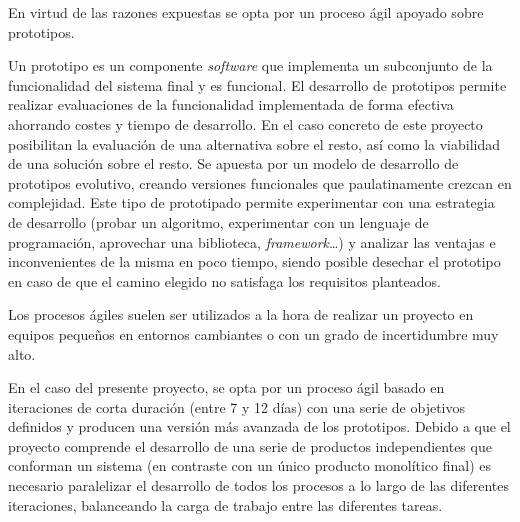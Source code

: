 En virtud de las razones expuestas se opta por un proceso ágil apoyado sobre prototipos. 

Un prototipo es un componente \textit{software} que implementa un subconjunto de la funcionalidad del sistema final y es funcional. El desarrollo de prototipos permite realizar evaluaciones de la funcionalidad implementada de forma efectiva ahorrando costes y tiempo de desarrollo. En el caso concreto de este proyecto posibilitan la evaluación de una alternativa sobre el resto, así como la viabilidad de una solución sobre el resto. Se apuesta por un modelo de desarrollo de prototipos evolutivo\cite{10.1109/TSE.1975.6312870}, creando versiones funcionales que paulatinamente crezcan en complejidad. Este tipo de prototipado permite experimentar con una estrategia de desarrollo (probar un algoritmo, experimentar con un lenguaje de programación, aprovechar una biblioteca, \textit{framework}\dots) y analizar las ventajas e inconvenientes de la misma en poco tiempo, siendo posible desechar el prototipo en caso de que el camino elegido no satisfaga los requisitos planteados.

Los procesos ágiles suelen ser utilizados a la hora de realizar un proyecto en equipos pequeños en entornos cambiantes o con un grado de incertidumbre muy alto.

En el caso del presente proyecto, se opta por un proceso ágil basado en iteraciones de corta duración (entre 7 y 12 días) con una serie de objetivos definidos y producen una versión más avanzada de los prototipos. Debido a que el proyecto comprende el desarrollo de una serie de productos independientes que conforman un sistema (en contraste con un único producto monolítico final) es necesario paralelizar el desarrollo de todos los procesos a lo largo de las diferentes iteraciones, balanceando la carga de trabajo entre las diferentes tareas.




